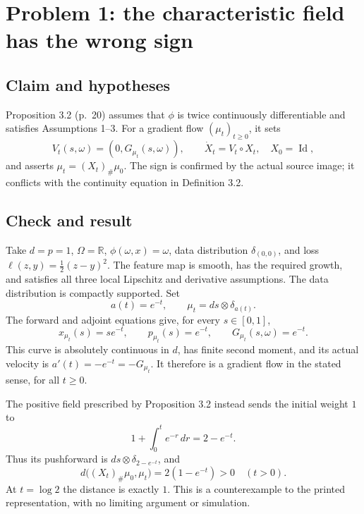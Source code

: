 \documentclass[10pt]{article}
\begin{document}
\section*{Problem 1: the characteristic field has the wrong sign}
\subsection*{Claim and hypotheses}
Proposition 3.2 (p. 20) assumes that \(\phi\) is twice continuously differentiable and satisfies Assumptions 1–3. For a gradient flow \((\mu_t)_{t\geq0}\), it sets \[V_t(s,\omega)=(0,G_{\mu_t}(s,\omega)),\qquad
 \dot X_t=V_t\circ X_t,\quad X_0=\operatorname{Id},\] and asserts \(\mu_t=(X_t)_\#\mu_0\). The sign is confirmed by the actual source image; it conflicts with the continuity equation in Definition 3.2.\par
\subsection*{Check and result}
Take \(d=p=1\), \(\Omega=\mathbb R\), \(\phi(\omega,x)=\omega\), data distribution \(\delta_{(0,0)}\), and loss \(\ell(z,y)=\tfrac12(z-y)^2\). The feature map is smooth, has the required growth, and satisfies all three local Lipschitz and derivative assumptions. The data distribution is compactly supported. Set \[a(t)=e^{-t},\qquad \mu_t=ds\otimes\delta_{a(t)}.\] The forward and adjoint equations give, for every \(s\in[0,1]\), \[x_{\mu_t}(s)=s e^{-t},\qquad
 p_{\mu_t}(s)=e^{-t},\qquad G_{\mu_t}(s,\omega)=e^{-t}.\] This curve is absolutely continuous in \(d\), has finite second moment, and its actual velocity is \(a'(t)=-e^{-t}=-G_{\mu_t}\). It therefore is a gradient flow in the stated sense, for all \(t\geq0\).\par
The positive field prescribed by Proposition 3.2 instead sends the initial weight \(1\) to \[1+\int_0^t e^{-r}\,dr=2-e^{-t}.\] Thus its pushforward is \(ds\otimes\delta_{2-e^{-t}}\), and \[d\bigl((X_t)_\#\mu_0,\mu_t\bigr)=2(1-e^{-t})>0
 \quad(t>0).\] At \(t=\log2\) the distance is exactly \(1\). This is a counterexample to the printed representation, with no limiting argument or simulation.\par
\end{document}
